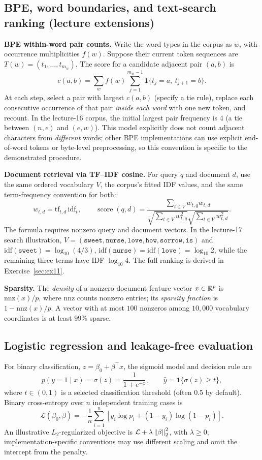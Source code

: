 \subsection{BPE, word boundaries, and text-search ranking (lecture extensions)}
\textbf{BPE within-word pair counts.} Write the word types in the corpus as $w$, with occurrence multiplicities $f(w)$. Suppose their current token sequences are $T(w)=(t_1,\ldots,t_{m_w})$. The score for a candidate adjacent pair $(a,b)$ is
\[
\boxed{c(a,b)=\sum_w f(w)\sum_{j=1}^{m_w-1}\mathbf1\{t_j=a,\ t_{j+1}=b\}}.
\]
At each step, select a pair with largest $c(a,b)$ (specify a tie rule), replace each consecutive occurrence of that pair \emph{inside each word} with one new token, and recount. In the lecture-16 corpus, the initial largest pair frequency is $4$ (a tie between $(n,e)$ and $(e,w)$). This model explicitly does not count adjacent characters from \emph{different} words; other BPE implementations can use explicit end-of-word tokens or byte-level preprocessing, so this convention is specific to the demonstrated procedure.

\textbf{Document retrieval via TF--IDF cosine.} For query $q$ and document $d$, use the same ordered vocabulary $V$, the corpus's fitted IDF values, and the same term-frequency convention for both:
\[
\boxed{w_{t,d}=\mathrm{tf}_{t,d}\,\mathrm{idf}_t},\qquad
\boxed{\operatorname{score}(q,d)=\frac{\displaystyle\sum_{t\in V}w_{t,q}w_{t,d}}{\displaystyle\sqrt{\sum_{t\in V}w_{t,q}^2}\sqrt{\sum_{t\in V}w_{t,d}^2}}}.
\]
The formula requires nonzero query and document vectors. In the lecture-17 search illustration, $V=(\texttt{sweet},\texttt{nurse},\texttt{love},\texttt{how},\texttt{sorrow},\texttt{is})$ and $\mathrm{idf}(\texttt{sweet})=\log_{10}(4/3)$, $\mathrm{idf}(\texttt{nurse})=\mathrm{idf}(\texttt{love})=\log_{10}2$, while the remaining three terms have IDF $\log_{10}4$. The full ranking is derived in Exercise~\ref{sec:ex11}.

\textbf{Sparsity.} The \emph{density} of a nonzero document feature vector $x\in\mathbb R^p$ is $\mathrm{nnz}(x)/p$, where $\mathrm{nnz}$ counts nonzero entries; its \emph{sparsity fraction} is $1-\mathrm{nnz}(x)/p$. A vector with at most $100$ nonzeros among $10{,}000$ vocabulary coordinates is at least $99\%$ sparse.

\subsection{Logistic regression and leakage-free evaluation}
For binary classification, $z=\beta_0+\beta^\top x$, the sigmoid model and decision rule are
\[
\boxed{p(y=1\mid x)=\sigma(z)=\frac1{1+e^{-z}}},\qquad
\hat y=\mathbf1\{\sigma(z)\ge t\},
\]
where $t\in(0,1)$ is a selected classification threshold (often $0.5$ by default). Binary cross-entropy over $n$ independent training cases is
\[
\boxed{\mathcal L(\beta_0,\beta)=-\frac1n\sum_{i=1}^{n}\left[y_i\log p_i+(1-y_i)\log(1-p_i)\right]}.
\]
An illustrative $L_2$-regularized objective is $\mathcal L+\lambda\left\lVert\beta\right\rVert_2^2$, with $\lambda\ge0$; implementation-specific conventions may use different scaling and omit the intercept from the penalty.

